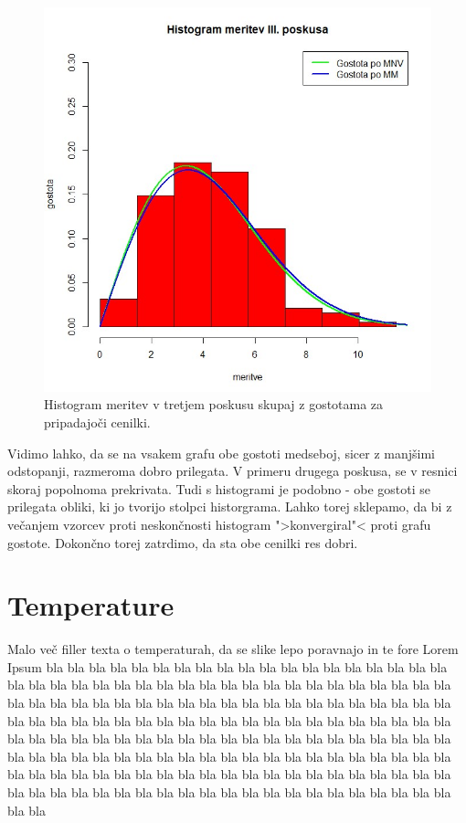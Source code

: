 \documentclass[a4paper, 10pt]{article}
\begin{document}
	\begin{figure}[h!]
		\label{fig: 2FHist3}
		\centering
		\includegraphics[scale=0.425]{Hist3}
		\caption{Histogram meritev v tretjem poskusu skupaj z gostotama za pripadajoči cenilki.}
	\end{figure}
	
	Vidimo lahko, da se na vsakem grafu obe gostoti medseboj, sicer z manjšimi odstopanji, razmeroma dobro prilegata. V primeru drugega poskusa, se v resnici skoraj popolnoma prekrivata. Tudi s histogrami je podobno - obe gostoti se prilegata obliki, ki jo tvorijo stolpci historgrama. Lahko torej sklepamo, da bi z večanjem vzorcev proti neskončnosti histogram ">konvergiral"< proti grafu gostote. Dokončno torej zatrdimo, da sta obe cenilki res dobri.
	
	\section{Temperature}\label{sect: Temperature}
	Malo več filler texta o temperaturah, da se slike lepo poravnajo in te fore Lorem Ipsum bla bla bla bla bla bla bla bla bla bla bla bla bla bla bla bla bla bla bla bla bla bla bla bla bla bla bla bla bla bla bla bla bla bla bla bla bla bla bla bla bla bla bla bla bla bla bla bla bla bla bla bla bla bla bla bla bla bla bla bla bla bla bla bla bla bla bla bla bla bla bla bla bla bla bla bla bla bla bla bla bla bla bla bla bla bla bla bla bla bla bla bla bla bla bla bla bla bla bla bla bla bla bla bla bla bla bla bla bla bla bla bla bla bla bla bla bla bla bla bla bla bla bla bla bla bla bla bla bla bla bla bla bla bla bla bla bla bla bla bla bla bla bla bla bla bla bla bla bla bla bla bla bla bla bla bla bla bla bla bla bla bla bla bla bla bla bla bla
\end{document}
